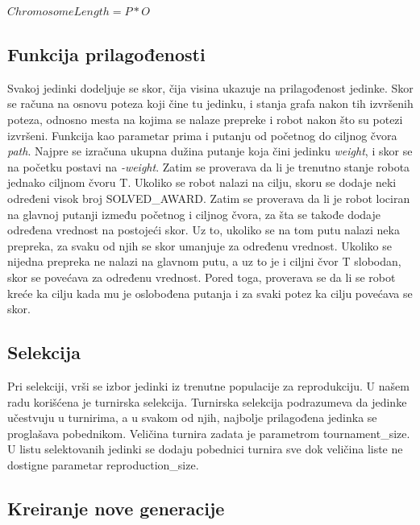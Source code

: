 \documentclass[12pt]{article}
\begin{document}
	$ ChromosomeLength =  P * O $  \newline
	
	
	\subsection{Funkcija prilagođenosti}

	\label{sec:drugoPoglavlje}
	Svakoj jedinki dodeljuje se skor, čija visina ukazuje na prilagođenost jedinke. Skor se računa na osnovu poteza koji čine tu jedinku, i stanja grafa nakon tih izvršenih poteza, odnosno mesta na kojima se nalaze prepreke i robot nakon što su potezi izvršeni. Funkcija kao parametar prima i putanju od početnog do ciljnog čvora \textit{path}. Najpre se izračuna ukupna dužina putanje koja čini jedinku \textit{weight}, i skor se na početku postavi na \textit{-weight}.
	Zatim se proverava da li je trenutno stanje robota jednako ciljnom čvoru T. Ukoliko se robot nalazi na cilju, skoru se dodaje neki određeni visok broj SOLVED\_AWARD. Zatim se proverava da li je robot lociran na glavnoj putanji između početnog i ciljnog čvora, za šta se takođe dodaje određena vrednost na postojeći skor. Uz to, ukoliko se na tom putu nalazi neka prepreka, za svaku od njih se skor umanjuje za određenu vrednost. Ukoliko se nijedna prepreka ne nalazi na glavnom putu, a uz to je i ciljni čvor T slobodan, skor se povećava za određenu vrednost. Pored toga, proverava se da li se robot kreće ka cilju kada mu je oslobođena putanja i za svaki potez ka cilju povećava se skor.
	\vspace*{1\baselineskip}
	
	
	\subsection{Selekcija}	
	Pri selekciji, vrši se izbor jedinki iz trenutne populacije za reprodukciju. U našem radu korišćena je turnirska selekcija. Turnirska selekcija podrazumeva da jedinke učestvuju u turnirima, a u svakom od njih, najbolje prilagođena jedinka se proglašava pobednikom. Veličina turnira zadata je parametrom tournament\_size. U listu selektovanih jedinki se dodaju pobednici turnira sve dok veličina liste ne dostigne parametar reproduction\_size. 
	\vspace*{1\baselineskip}
	
	
	
	\subsection{Kreiranje nove generacije}	
	\label{sec:trecePoglavlje}
	
\end{document}
